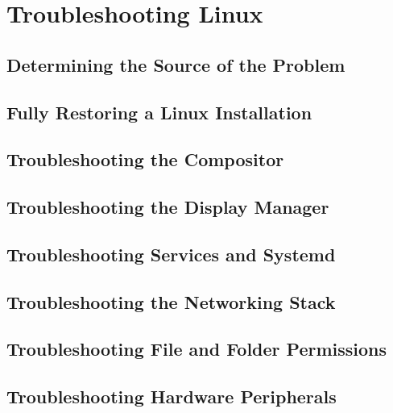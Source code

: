 \chapter{Troubleshooting Linux}
\localtableofcontents
\clearpage

\section{Determining the Source of the Problem}

\linebreak

\section{Fully Restoring a Linux Installation}

\linebreak

\section{Troubleshooting the Compositor}

\linebreak

\section{Troubleshooting the Display Manager}

\linebreak

\section{Troubleshooting Services and Systemd}

\linebreak

\section{Troubleshooting the Networking Stack}

\linebreak

\section{Troubleshooting File and Folder Permissions}

\linebreak

\section{Troubleshooting Hardware Peripherals}

\linebreak